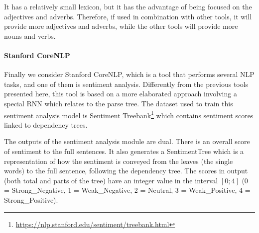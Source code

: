 It has a relatively small lexicon, but it has the advantage of being focused on the adjectives and adverbs.
Therefore, if used in combination with other tools, it will provide more adjectives and adverbs, while the other tools will provide more nouns and verbs.


\paragraph{Stanford CoreNLP}
Finally we consider Stanford CoreNLP, which is a tool that performs several NLP tasks, and one of them is sentiment analysis.
Differently from the previous tools presented here, this tool is based on a more elaborated approach involving a special RNN which relates to the parse tree. 
The dataset used to train this sentiment analysis model is Sentiment Treebank\footnote{\url{https://nlp.stanford.edu/sentiment/treebank.html}} which contains sentiment scores linked to dependency trees.

The outputs of the sentiment analysis module are dual. There is an overall score of sentiment to the full sentences. It also generates a SentimentTree which is a representation of how the sentiment is conveyed from the leaves (the single words) to the full sentence, following the dependency tree.
The scores in output (both total and parts of the tree) have an integer value in the interval $[0;4]$ (0 = Strong\_Negative, 1 = Weak\_Negative, 2 = Neutral, 3 = Weak\_Positive, 4 = Strong\_Positive).


